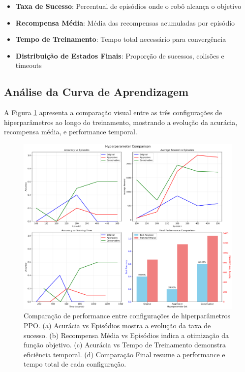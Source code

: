 \documentclass[9pt,a4paper,twoside]{tau}
\begin{document}
\begin{itemize}
    \item \textbf{Taxa de Sucesso}: Percentual de episódios onde o robô alcança o objetivo
    \item \textbf{Recompensa Média}: Média das recompensas acumuladas por episódio
    \item \textbf{Tempo de Treinamento}: Tempo total necessário para convergência
    \item \textbf{Distribuição de Estados Finais}: Proporção de sucessos, colisões e timeouts
\end{itemize}



\subsection{Análise da Curva de Aprendizagem}

A Figura \ref{fig:hyperparameter_comparison} apresenta a comparação visual entre as três configurações de hiperparâmetros ao longo do treinamento, mostrando a evolução da acurácia, recompensa média, e performance temporal.

\begin{figure}[htbp]
   \centering
       \includegraphics[width=1.0\columnwidth]{Figures/hyperparameter_comparison.png}
       \caption{Comparação de performance entre configurações de hiperparâmetros PPO. (a) Acurácia vs Episódios mostra a evolução da taxa de sucesso. (b) Recompensa Média vs Episódios indica a otimização da função objetivo. (c) Acurácia vs Tempo de Treinamento demonstra eficiência temporal. (d) Comparação Final resume a performance e tempo total de cada configuração.}
   \label{fig:hyperparameter_comparison}
\end{figure}
\end{document}
